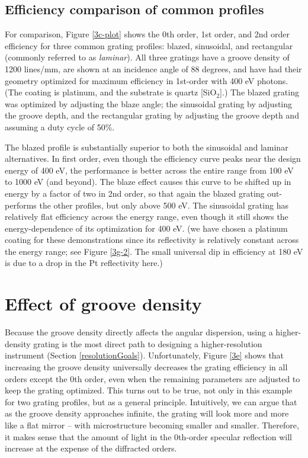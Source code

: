 \subsection{Efficiency comparison of common profiles}
For comparison, Figure \ref{3c-plot} shows the 0th order, 1st order, and 2nd order efficiency for three common grating profiles: blazed, sinusoidal, and rectangular (commonly referred to as \emph{laminar}).  All three gratings have a groove density of 1200 lines/mm, are shown at an incidence angle of 88 degrees, and have had their geometry optimized for maximum efficiency in 1st-order with 400 eV photons.  (The coating is platinum, and the substrate is quartz [SiO$_2$].)  The blazed grating was optimized by adjusting the blaze angle; the sinusoidal grating by adjusting the groove depth, and the rectangular grating by adjusting the groove depth and assuming a duty cycle of 50\%.

The blazed profile is substantially superior to both the sinusoidal and laminar alternatives.  In first order, even though the efficiency curve peaks near the design energy of 400 eV, the performance is better across the entire range from 100 eV to 1000 eV (and beyond).  The blaze effect causes this curve to be shifted up in energy by a factor of two in 2nd order, so that again the blazed grating out-performs the other profiles, but only above 500 eV.  The sinusoidal grating has relatively flat efficiency across the energy range, even though it still shows the energy-dependence of its optimization for 400 eV.   (we have chosen a platinum coating for these demonstrations since its reflectivity is relatively constant across the energy range; see Figure \ref{3g-2}.  The small universal dip in efficiency at 180 eV is due to a drop in the Pt reflectivity here.)

\section{Effect of groove density}
Because the groove density directly affects the angular dispersion, using a higher-density grating is the most direct path to designing a higher-resolution instrument (Section \ref{resolutionGoals}).  Unfortunately, Figure \ref{3e} shows that increasing the groove density universally decreases the grating efficiency in all orders except the 0th order, even when the remaining parameters are adjusted to keep the grating optimized.  This turns out to be true, not only in this example for two grating profiles, but as a general principle.  Intuitively, we can argue that as the groove density approaches infinite, the grating will look more and more like a flat mirror -- with microstructure becoming smaller and smaller.  Therefore, it makes sense that the amount of light in the 0th-order specular reflection will increase at the expense of the diffracted orders.

